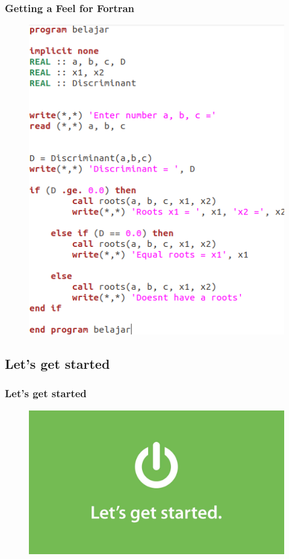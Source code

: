 \documentclass{beamer}
\begin{document}

\begin{frame}
\frametitle{Getting a Feel for Fortran}
\begin{figure}
\centering
\includegraphics[scale=0.35]{tes.png}
\end{figure}
\end{frame}

\subsection{Let's get started}
\begin{frame}
\frametitle{Let's get started}
\begin{figure}
\centering
\includegraphics[scale=0.1]{letsgetstarted.jpg}
\end{figure}
\end{frame}
\end{document}
